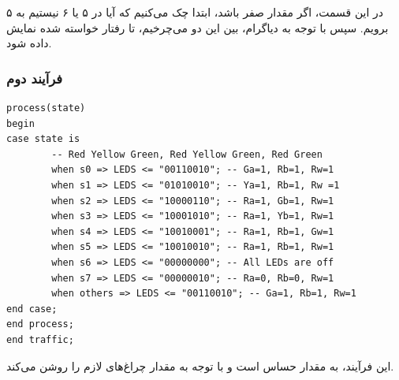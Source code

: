 \documentclass[dvipsnames, svgnames, x11names, a4paper, 11pt]{article}
\begin{document}
در این قسمت، اگر مقدار  صفر باشد، ابتدا چک می‌کنیم که آیا در 
۵
 یا ۶ نیستیم به 
۵ برویم. سپس با توجه به دیاگرام، بین این دو 
می‌چرخیم، تا رفتار خواسته شده نمایش داده شود.

\newpage
\subsubsection{فرآیند دوم}
\label{second-process}
\begin{latin}
\begin{lstlisting}[firstnumber=131]
process(state)
begin
case state is
		-- Red Yellow Green, Red Yellow Green, Red Green
		when s0 => LEDS <= "00110010"; -- Ga=1, Rb=1, Rw=1
		when s1 => LEDS <= "01010010"; -- Ya=1, Rb=1, Rw =1
		when s2 => LEDS <= "10000110"; -- Ra=1, Gb=1, Rw=1
		when s3 => LEDS <= "10001010"; -- Ra=1, Yb=1, Rw=1
		when s4 => LEDS <= "10010001"; -- Ra=1, Rb=1, Gw=1
		when s5 => LEDS <= "10010010"; -- Ra=1, Rb=1, Rw=1
		when s6 => LEDS <= "00000000"; -- All LEDs are off
        when s7 => LEDS <= "00000010"; -- Ra=0, Rb=0, Rw=1
		when others => LEDS <= "00110010"; -- Ga=1, Rb=1, Rw=1
end case;
end process;
end traffic;
\end{lstlisting}
\end{latin}

این فرآیند، به مقدار 
حساس است و با توجه به مقدار 
چراغ‌های لازم را روشن می‌کند.
\end{document}
